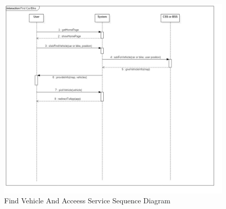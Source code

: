 \documentclass{article}
\begin{document}
\begin{figure}[H]
\includegraphics[width=\linewidth]{Find_Car_Bike.jpg}
\caption{Find Vehicle And Acceess Service Sequence Diagram}
\label{fig:SQ7}
\end{figure}
\end{document}
